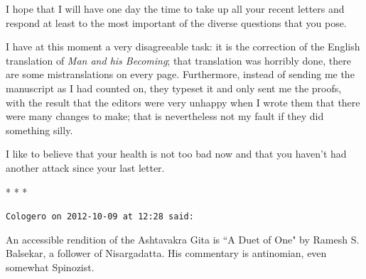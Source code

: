 I hope that I will have one day the time to take up all your recent letters and respond at least to the most important
of the diverse questions that you pose.

I have at this moment a very disagreeable task: it is the correction of the English translation of \emph{Man and his
Becoming}; that translation was horribly done, there are some mistranslations on every page. Furthermore, instead of
sending me the manuscript as I had counted on, they typeset it and only sent me the proofs, with the result that the
editors were very unhappy when I wrote them that there were many changes to make; that is nevertheless not my fault if
they did something silly.

I like to believe that your health is not too bad now and that you haven't had another attack since
your last letter.




\begin{center}* * *\end{center}

\begin{footnotesize}\begin{sffamily}



\texttt{Cologero on 2012-10-09 at 12:28 said: }

An accessible rendition of the Ashtavakra Gita is ``A Duet of One" by Ramesh S. Balsekar, a follower of Nisargadatta. His
commentary is antinomian, even somewhat Spinozist.


\end{sffamily}\end{footnotesize}

